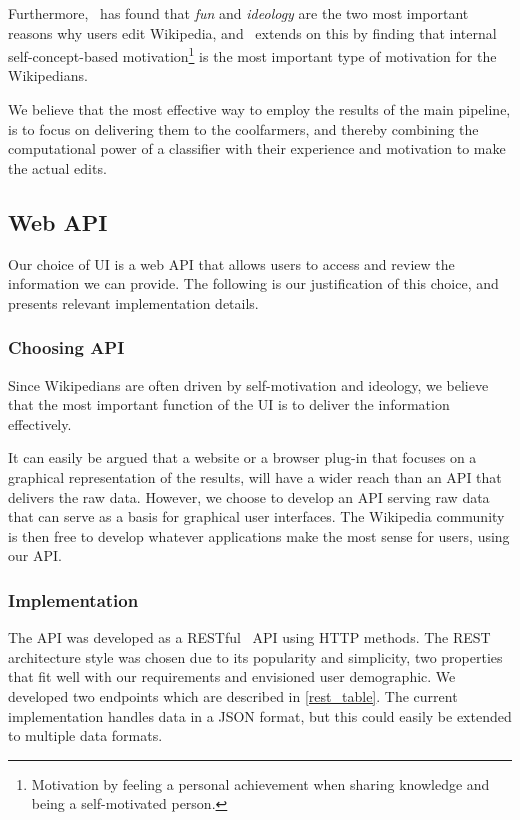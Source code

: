 Furthermore,~\cite{wiki_motivation} has found that \emph{fun} and \emph{ideology} are the two most important reasons why users edit Wikipedia, and~\cite{Yang20101377} extends on this by finding that internal self-concept-based motivation\footnote{Motivation by feeling a personal achievement when sharing knowledge and being a self-motivated person.} is the most important type of motivation for the Wikipedians.

We believe that the most effective way to employ the results of the main pipeline, is to focus on delivering them to the coolfarmers, and thereby combining the computational power of a classifier with their experience and motivation to make the actual edits.


\subsection{Web API}

Our choice of UI is a web API that allows users to access and review the information we can provide. The following is our justification of this choice, and presents relevant implementation details.

\subsubsection{Choosing API}
Since Wikipedians are often driven by self-motivation and ideology, we believe that the most important function of the UI is to deliver the information effectively.

It can easily be argued that a website or a browser plug-in that focuses on a graphical representation of the results, will have a wider reach than an API that delivers the raw data. However, we choose to develop an API serving raw data that can serve as a basis for graphical user interfaces. The Wikipedia community is then free to develop whatever applications make the most sense for users, using our API.

\subsubsection{Implementation}

The API was developed as a RESTful~\cite{rest} API using HTTP methods. The REST architecture style was chosen due to its popularity and simplicity, two properties that fit well with our requirements and envisioned user demographic. We developed two endpoints which are described in \cref{rest_table}. The current implementation handles data in a JSON format, but this could easily be extended to multiple data formats.

